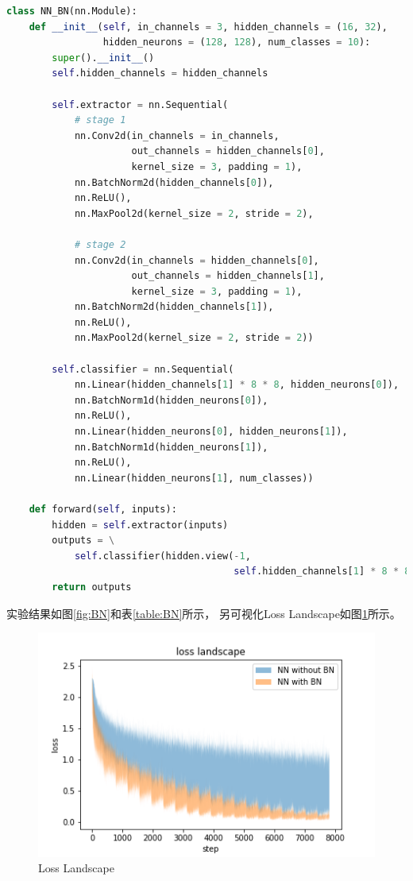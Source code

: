 \documentclass{article}
\begin{document}
\begin{lstlisting}[language=Python]
class NN_BN(nn.Module):
    def __init__(self, in_channels = 3, hidden_channels = (16, 32),
                 hidden_neurons = (128, 128), num_classes = 10):
        super().__init__()
        self.hidden_channels = hidden_channels

        self.extractor = nn.Sequential(
            # stage 1
            nn.Conv2d(in_channels = in_channels,
                      out_channels = hidden_channels[0],
                      kernel_size = 3, padding = 1),
            nn.BatchNorm2d(hidden_channels[0]),
            nn.ReLU(),
            nn.MaxPool2d(kernel_size = 2, stride = 2),

            # stage 2
            nn.Conv2d(in_channels = hidden_channels[0],
                      out_channels = hidden_channels[1],
                      kernel_size = 3, padding = 1),
            nn.BatchNorm2d(hidden_channels[1]),
            nn.ReLU(),
            nn.MaxPool2d(kernel_size = 2, stride = 2))

        self.classifier = nn.Sequential(
            nn.Linear(hidden_channels[1] * 8 * 8, hidden_neurons[0]),
            nn.BatchNorm1d(hidden_neurons[0]),
            nn.ReLU(),
            nn.Linear(hidden_neurons[0], hidden_neurons[1]),
            nn.BatchNorm1d(hidden_neurons[1]),
            nn.ReLU(),
            nn.Linear(hidden_neurons[1], num_classes))

    def forward(self, inputs):
        hidden = self.extractor(inputs)
        outputs = \
            self.classifier(hidden.view(-1,
                                        self.hidden_channels[1] * 8 * 8))
        return outputs
\end{lstlisting}

实验结果如图\ref{fig:BN}和表\ref{table:BN}所示，
另可视化Loss Landscape如图\ref{fig:NNLL}所示。

\begin{figure}[h]
\includegraphics[width=\textwidth]
{Result/NN BN 0.0005/figure.png}
\caption{Loss Landscape}
\label{fig:NNLL}
\end{figure}
\end{document}
